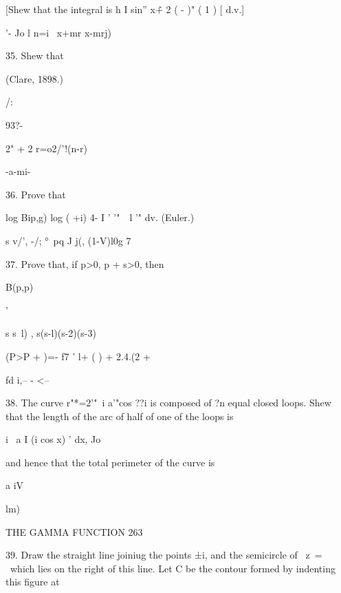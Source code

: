 [Shew that the integral is h I sin'' x\~+ 2 ( - )" ( 1 ) [ d.v.]

'- Jo l n=i \ x+mr x-mrj)

35. Shew that



(Clare, 1898.)



/:



93?-



2" + 2 r=o2/'!(n-r)



-a-mi-



36. Prove that



log Bip,g) log ( +i) 4- I ' \: '"\ \ l '" dv. (Euler.)

s v/', -/; °\ pq J j(, (1-V)l0g 7



37. Prove that, if p>0, p + s>0, then



B(p,p)



 '



s s~l) , s(s-l)(s-2)(s-3)



 (P>P + )=- f7 ' l+ ( ) + 2.4.(2 +



fd i,-- - <--



38. The curve r"*=2'"~i a'"cos ??i is composed of ?n equal closed
loops. Shew that the length of the arc of half of one of the loops is



i~ a I (i cos x) ' dx, Jo



and hence that the total perimeter of the curve is



a iV



lm)\






THE GAMMA FUNCTION 263

39. Draw the straight line joiniug the points ±i, and the semicircle
of \ z\ = \ which lies on the right of this line. Let C be the contour
formed by indenting this figure at

